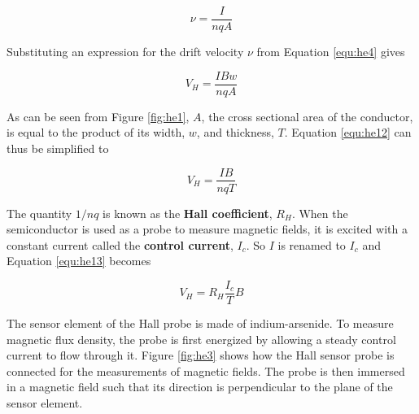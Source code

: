 \begin{equation}
\nu=\dfrac{I}{nqA}
\label{equ:he11}
\end{equation}

\noindent Substituting an expression for the drift velocity $\nu$ from Equation \ref{equ:he4} gives

\begin{equation}
V_H=\dfrac{IBw}{nqA}
\label{equ:he12}
\end{equation}

\noindent As can be seen from Figure \ref{fig:he1}, $A$, the cross sectional area of the conductor, is equal to the product of its width, $w$, and thickness, $T$. Equation \ref{equ:he12} can thus be simplified to

\begin{equation}
V_H=\dfrac{IB}{nqT}
\label{equ:he13}
\end{equation} 

\noindent The quantity $1/nq$ is known as the {\bf Hall coefficient}, $R_H$. When the semiconductor is used as a probe to measure magnetic fields, it is excited with a constant current called the {\bf control current}, $I_c$. So $I$ is renamed to $I_c$ and Equation \ref{equ:he13} becomes

\begin{equation}
V_H=R_H\dfrac{I_c}{T}B
\label{equ:he14}
\end{equation}

The sensor element of the Hall probe is made of indium-arsenide. To measure magnetic flux density, the probe is first energized by allowing a steady control current to flow through it. Figure \ref{fig:he3} shows how the Hall sensor probe is connected for the measurements of magnetic fields. The probe is then immersed in a magnetic field such that its direction is perpendicular to the plane of the sensor element. 

